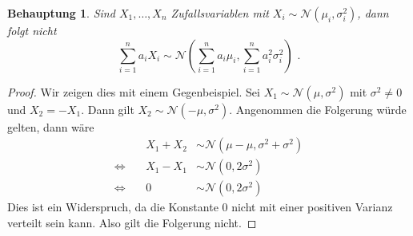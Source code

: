 \documentclass[a4paper]{scrartcl}
\newtheorem*{behaupt}{Behauptung}
\newcommand{\gdw}{\Leftrightarrow}
\def \blattnr {7}
\begin{document}
\begin{enumerate}[label=\bfseries \blattnr.\arabic*]
\begin{enumerate}
            \begin{behaupt}
                Sind $X_1, \dotsc, X_n$ Zufallsvariablen mit
                $X_i \sim \mathcal{N}(\mu_i, \sigma_i^2)$,
                dann folgt nicht
                \begin{equation*}
                    \sum_{i=1}^n a_i X_i \sim
                    \mathcal{N} \left( \sum_{i=1}^n a_i \mu_i,
                                       \sum_{i=1}^n a_i^2 \sigma_i^2 \right)
                    \text{ .}
                \end{equation*}
            \end{behaupt}
            \begin{proof}
                Wir zeigen dies mit einem Gegenbeispiel.
                Sei $X_1 \sim \mathcal{N}(\mu, \sigma^2)$ mit $\sigma^2 \neq 0$
                und $X_2 = -X_1$.  Dann gilt $X_2 \sim \mathcal{N}(-\mu,
                \sigma^2)$.  Angenommen die Folgerung würde gelten, dann wäre
                \begin{equation*}
                    \begin{alignedat}{2}
                        && X_1 + X_2 &\sim
                        \mathcal{N} \left( \mu - \mu, \sigma^2 + \sigma^2 \right) \\
                        \gdw\ && X_1 - X_1 &\sim
                        \mathcal{N} \left( 0, 2 \sigma^2 \right) \\
                        \gdw\ && 0 &\sim
                        \mathcal{N} \left( 0, 2 \sigma^2 \right)
                    \end{alignedat}
                \end{equation*}
                Dies ist ein Widerspruch, da die Konstante $0$ nicht mit einer
                positiven Varianz verteilt sein kann.
                Also gilt die Folgerung nicht.
            \end{proof}


\end{enumerate}
\end{enumerate}
\end{document}
